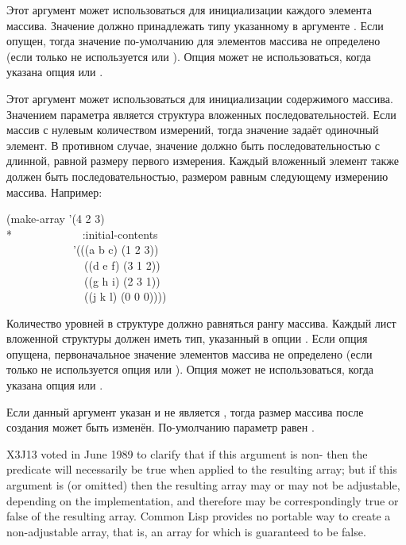 \begin{defun}[Функция]
\begin{flushdesc}
\item[\cd{:initial-element}]
Этот аргумент может использоваться для инициализации каждого элемента
массива. Значение должно принадлежать типу указанному в аргументе
. Если  опущен, тогда значение
по-умолчанию для элементов массива не определено (если только не используется
 или ).
Опция  может не использоваться, когда указана опция
 или .

\item[\cd{:initial-contents}]
Этот аргумент может использоваться для инициализации содержимого
массива. Значением параметра является структура вложенных
последовательностей. Если массив с нулевым количеством измерений, тогда значение
задаёт одиночный элемент. В противном случае, значение должно быть
последовательностью с длинной, равной размеру первого измерения. Каждый
вложенный элемент также должен быть последовательностью, размером равным
следующему измерению массива.
Например:
\begin{lisp}
(make-array '(4 2 3) \\*
~~~~~~~~~~~~:initial-contents \\
~~~~~~~~~~~~'(((a b c) (1 2 3)) \\
~~~~~~~~~~~~~~((d e f) (3 1 2)) \\
~~~~~~~~~~~~~~((g h i) (2 3 1)) \\
~~~~~~~~~~~~~~((j k l) (0 0 0))))
\end{lisp}
Количество уровней в структуре должно равняться рангу массива.
Каждый лист вложенной структуры должен иметь тип, указанный в опции
. Если опция  опущена, первоначальное значение
элементов массива не определено (если только не используется опция
 или ).
Опция  может не использоваться, когда указана опция
 или .

\item[\cd{:adjustable}]
Если данный аргумент указан и не является {\false}, тогда размер массива после
создания может быть изменён. По-умолчанию параметр равен {\false}.

\begin{newer}
X3J13 voted in June 1989
to clarify that if this argument is non-{\false}
then the predicate  will necessarily be true when applied
to the resulting array; but if this argument is  (or omitted) then the
resulting array may or may not be adjustable, depending on the implementation,
and therefore  may be correspondingly true or false of
the resulting array.  Common Lisp provides no portable way to create a
non-adjustable array, that is, an array for which  is
guaranteed to be false.
\end{newer}


\end{flushdesc}
\end{defun}
